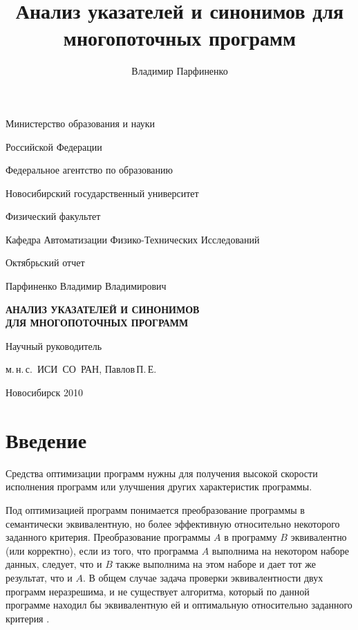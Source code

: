 \documentclass[a4,14pt,titlepage]{extarticle}
\title{
  Анализ указателей и синонимов для многопоточных программ
}
\author{
  Владимир Парфиненко
}
\begin{document}
  \thispagestyle{empty}
  \begin {center}
    Министерство образования и науки

    Российской Федерации

    Федеральное агентство по образованию

    \vspace{0.3cm}

    Новосибирский государственный университет

    \vspace{0.3cm}

    Физический факультет

    Кафедра Автоматизации Физико-Технических Исследований

    \vspace {40mm}

    Октябрьский отчет

    \vspace {10mm}

    Парфиненко Владимир Владимирович

    \vspace {5mm}

    \textbf{АНАЛИЗ УКАЗАТЕЛЕЙ И СИНОНИМОВ\\ ДЛЯ МНОГОПОТОЧНЫХ ПРОГРАММ}

    \vspace {20mm}

    {\raggedleft

    Научный руководитель

    м.\,н.\,с.~ИСИ~СО~РАН, Павлов\,П.\,Е.

    \vspace {50mm}

    Новосибирск 2010}
  \end {center}


  \tableofcontents

  \newpage
  \section{Введение}

    Средства оптимизации программ нужны для получения высокой
    скорости исполнения программ или улучшения других характеристик программы.

    Под оптимизацией программ понимается преобразование программы в
    семантически эквивалентную, но более эффективную относительно некоторого
    заданного критерия.
    Преобразование программы $A$ в программу $B$ эквивалентно (или корректно),
    если из того, что программа $A$ выполнима на некотором наборе данных,
    следует, что и $B$ также выполнима на этом наборе и дает тот же результат,
    что и $A$.
    В общем случае задача проверки эквивалентности двух программ неразрешима,
    и не существует алгоритма, который по данной программе находил бы
    эквивалентную ей и оптимальную относительно заданного критерия
    \cite{kasjanov_translators}.
\end{document}
